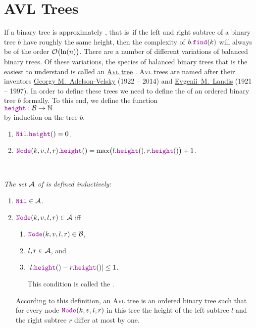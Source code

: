 \section{AVL Trees}
If a binary tree is approximately , that is~if the left and right subtree of a binary tree $b$  have
roughly the same height, then the complexity of $b.\mytt{find}(k)$ will always be of the order
$\mathcal{O}\bigl(\ln(n)\bigr)$.  There are a number of different variations of
balanced binary trees.  Of these variations, the species of balanced binary trees that is the easiest to understand is
called an \href{https://en.wikipedia.org/wiki/Avl_tree}{\textsc{Avl} tree} \cite{adelson:62}.  \textsc{Avl} trees are 
named after their inventors \href{https://en.wikipedia.org/wiki/Georgy_Adelson-Velsky}{Georgy M.~Adelson-Velsky}
(1922 -- 2014) and \href{https://en.wikipedia.org/wiki/Evgenii_Landis}{Evgenii~M.~Landis} (1921 -- 1997).
In order to define these trees we need to define the  of an ordered binary tree $b$ formally.  To this
end, we define the function
\\[0.2cm]
\hspace*{1.3cm}
$\mytt{height}: \mathcal{B} \rightarrow \mathbb{N}$
\\[0.2cm]
by induction on the tree $b$.
\begin{enumerate}
\item $\mytt{Nil}.\mytt{height}() = 0$.
\item $\mytt{Node}(k,v,l,r).\mytt{height}() = 
       \max\bigl( l.\mytt{height}(), r.\mytt{height}() \bigr) + 1$. 
\end{enumerate}

\begin{Definition} \hspace*{\fill} \\
{\em 
  The set $\mathcal{A}$ of   is defined inductively:
  \begin{enumerate}
  \item $\mytt{Nil} \in \AVL$.
  \item $\mytt{Node}(k,v,l,r) \in \AVL$ \quad iff 
        \begin{enumerate}
        \item $\mytt{Node}(k,v,l,r) \in \Bin$,
        \item $l, r \in \mathcal{A}$, \quad and
        \item $|l.\mytt{height}() - r.\mytt{height}()| \leq 1$.

              This condition is called the . 
        \end{enumerate}
        According to this definition, an \textsc{Avl} tree is an ordered binary tree such that for every node
        $\mytt{Node}(k,v,l,r)$ in this tree the height of the left subtree $l$ and the right
        subtree  $r$ differ at most by one.  \eox
  \end{enumerate}
}  
\end{Definition}

